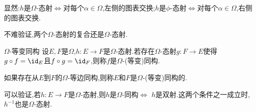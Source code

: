 显然:$h$是$\Omega$-态射$\iff$对每个$\alpha\in\Omega$,左侧的图表交换;$h$是$\phi$-态射$\iff$对每个$\alpha\in\Omega$,右侧的图表交换.
\begin{center}
\end{center}

不难验证,两个$\Omega$-态射的复合还是$\Omega$-态射.

\begin{definition}{$\Omega$-等变同构}{}
	设$E,F$是$\Omega$,$h:E\to F$是$\Omega$-态射.若存在$\Omega$-态射$g:F\to E$使得$g\circ f=\id_{E}$且$f\circ g=\id_{F}$,则称$f$是$\Omega$-(等变)同构.
	
	如果存在从$E$到$F$的$\Omega$-等边同构,则称$E$和$F$是$\Omega$-(等变)同构的.
\end{definition}

可以验证,若$h:E\to F$是$\Omega$-态射,则$h$是$\Omega$-同构$\iff$ $h$是双射.这两个条件之一成立时,$h^{-1}$也是$\Omega$-态射.






















